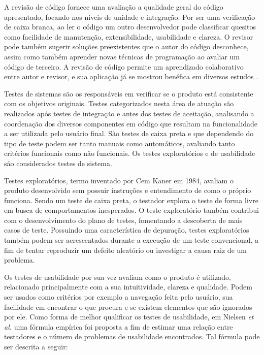 A revisão de código fornece uma avaliação a qualidade geral do código apresentado, focando nos níveis de unidade e integração. Por ser uma verificação de caixa branca, ao ler o código um outro desenvolvedor pode classificar quesitos como facilidade de manutenção, extensibilidade, usabilidade e clareza. O revisor pode também sugerir soluções preexistentes que o autor do código desconhece, assim como também aprender novas técnicas de programação ao avaliar um código de terceiro. A revisão de código permite um aprendizado colaborativo entre autor e revisor, e sua aplicação já se mostrou benéfica em diversos estudos \cite{bacchelli}.

Testes de sistemas são os responsáveis em verificar se o produto está consistente com os objetivos originais. Testes categorizados nesta área de atuação são realizados após testes de integração e antes dos testes de aceitação, analisando a coordenação dos diversos componentes em código que resultam na funcionalidade a ser utilizada pelo usuário final. São testes de caixa preta e que dependendo do tipo de teste podem ser tanto manuais como automáticos, avaliando tanto critérios funcionais como não funcionais. Os testes exploratórios e de usabilidade são considerados testes de sistema.

Testes exploratórios, termo inventado por Cem Kaner \cite{kaner} em 1984, avaliam o produto desenvolvido sem possuir instruções e entendimento de como o próprio funciona. Sendo um teste de caixa preta, o testador explora o teste de forma livre em busca de comportamentos inesperados. O teste exploratório também contribui com o desenvolvimento do plano de testes, fomentando a descoberta de mais casos de teste. Possuindo uma característica de depuração, testes exploratórios também podem ser acrescentados durante a execução de um teste convencional, a fim de tentar reproduzir um defeito aleatório ou investigar a causa raiz de um problema.

Os testes de usabilidade por sua vez avaliam como o produto é utilizado, relacionado principalmente com a sua intuitividade, clareza e qualidade. Podem ser usados como critérios por exemplo a navegação feita pelo usuário, sua facilidade em encontrar o que procura e se existem elementos que são ignorados por ele. Como forma de melhor qualificar os testes de usabilidade, em Nielsen \emph{et al.} \cite{nielsen} uma fórmula empírica foi proposta a fim de estimar uma relação entre testadores e o número de problemas de usabilidade encontrados. Tal fórmula pode ser descrita a seguir:

